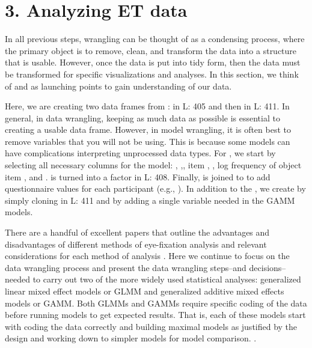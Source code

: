 \section{3. Analyzing ET data}

In all previous steps, wrangling can be thought of as a condensing process, where the primary object is to remove, clean, and transform the data into a structure that is usable. However, once the data is put into tidy form, then the data must be transformed for specific visualizations and analyses. In this section, we think of  and  as launching points to gain understanding of our data. 

 Here, we are creating two data frames from :  in L: 405 and then  in L: 411. In general, in data wrangling, keeping as much data as possible is essential to creating a usable data frame. However, in model wrangling, it is often best to remove variables that you will not be using. This is because some models can have complications interpreting unprocessed data types. For , we start by selecting all necessary columns for the model: , ,, item , , log frequency of object item , and  .  is turned into a factor in L: 408. Finally,  is joined to  to add questionnaire values for each participant (e.g., ). In addition to the , we create  by simply cloning  in L: 411 and by adding a single variable needed in the GAMM models.



There are a handful of excellent papers that outline the advantages and disadvantages of different methods of eye-fixation analysis and relevant considerations for each method of analysis \parencite{Ito_Knoeferle_2022,Mirman_Dixon_Magnuson_2008,McMurray_2023,Barr_2008}. Here we continue to focus on the data wrangling process and present the data wrangling steps--and decisions--needed to carry out two of the more widely used statistical analyses: generalized linear mixed effect models or GLMM and generalized additive mixed effects models or GAMM. Both GLMMs and GAMMs require specific coding of the data before running models to get expected results. That is, each of these models start with coding the data correctly and building maximal models as justified by the design and working down to simpler models for model comparison. \parencite{Barr_Levy_Scheepers_Tily_2013}.

